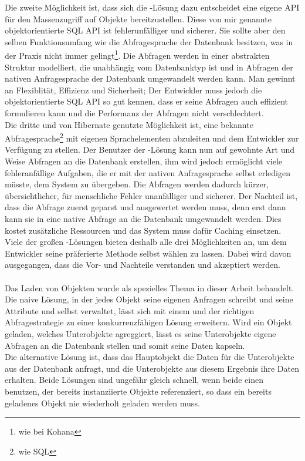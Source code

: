 Die zweite Möglichkeit ist, dass sich die \ORM-Lösung dazu entscheidet eine eigene API für den Massenzugriff auf Objekte bereitzustellen. Diese von mir genannte objektorientierte SQL API ist fehlerunfälliger und sicherer. Sie sollte aber den selben Funktionsumfang wie die Abfragesprache der Datenbank besitzen, was in der Praxis nicht immer gelingt\footnote{wie bei Kohana}. Die Abfragen werden in einer abstrakten Struktur modelliert, die unabhängig vom Datenbanktyp ist und in Abfragen der nativen Anfragesprache der Datenbank umgewandelt werden kann. Man gewinnt an Flexiblität, Effizienz und Sicherheit; Der Entwickler muss jedoch die objektorientierte SQL API so gut kennen, dass er seine Abfragen auch effizient formulieren kann und die Performanz der Abfragen nicht verschlechtert. \\
Die dritte und von Hibernate genutzte Möglichkeit ist, eine bekannte Abfragesprache\footnote{wie SQL} mit eigenen Sprachelementen abzuleiten und dem Entwickler zur Verfügung zu stellen. Der Benutzer der \ORM-Lösung kann nun auf gewohnte Art und Weise Abfragen an die Datenbank erstellen, ihm wird jedoch ermöglicht viele fehleranfällige Aufgaben, die er mit der nativen Anfragesprache selbst erledigen müsste, dem System zu übergeben. Die Abfragen werden dadurch kürzer, übersichtlicher, für menschliche Fehler unanfälliger und sicherer. Der Nachteil ist, dass die Abfrage zuerst geparst und ausgewertet werden muss, denn erst dann kann sie in eine native Abfrage an die Datenbank umgewandelt werden. Dies kostet zusätzliche Ressourcen und das System muss dafür Caching einsetzen. \\
Viele der großen \ORM-Lösungen bieten deshalb alle drei Möglichkeiten an, um dem Entwickler seine präferierte Methode selbst wählen zu lassen. Dabei wird davon ausgegangen, dass die Vor- und Nachteile verstanden und akzeptiert werden. \\
\\
Das Laden von Objekten wurde als spezielles Thema in dieser Arbeit behandelt. Die naive Lösung, in der jedes Objekt seine eigenen Anfragen schreibt und seine Attribute und  selbst verwaltet, lässt sich mit einem \objectcache und der richtigen Abfragestrategie zu einer konkurrenzfähigen Lösung erweitern. Wird ein Objekt geladen, welches Unterobjekte agreggiert, lässt es seine Unterobjekte eigene Abfragen an die Datenbank stellen und somit seine Daten kapseln. \\
Die alternative Lösung ist, dass das Hauptobjekt die Daten für die Unterobjekte aus der Datenbank anfragt, und die Unterobjekte aus diesem Ergebnis ihre Daten erhalten. Beide Lösungen sind ungefähr gleich schnell, wenn beide einen \objectcache benutzen, der bereits instanziierte Objekte referenziert, so dass ein bereits geladenes Objekt nie wiederholt geladen werden muss. \\
